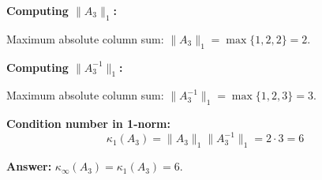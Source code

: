 \documentclass[reqno, answers]{exam}
\begin{document}
\begin{questions}
\begin{solution}
\textbf{Computing $\|A_3\|_1$:}

Maximum absolute column sum: $\|A_3\|_1 = \max\{1, 2, 2\} = 2$.

\textbf{Computing $\|A_3^{-1}\|_1$:}

Maximum absolute column sum: $\|A_3^{-1}\|_1 = \max\{1, 2, 3\} = 3$.

\textbf{Condition number in 1-norm:}
\[
\kappa_1(A_3) = \|A_3\|_1 \|A_3^{-1}\|_1 = 2 \cdot 3 = 6
\]

\textbf{Answer:} $\kappa_\infty(A_3) = \kappa_1(A_3) = 6$.
\end{solution}\end{questions}
\end{document}

